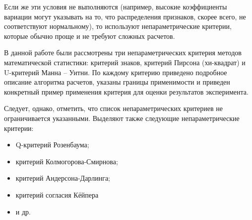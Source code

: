 \documentclass[12pt]{article}
\begin{document}
Если же эти условия не выполняются (например, высокие коэффициенты вариации могут указывать на то, что распределения признаков, скорее всего, не соответствуют нормальному), то используют непараметрические критерии, которые обычно проще и не требуют сложных расчетов.

В данной работе были рассмотрены три непараметрических критерия методов математической статистики: критерий знаков, критерий Пирсона (хи-квадрат) и U-критерий Манна – Уитни. По каждому критерию приведено подробное описание алгоритма расчетов, указаны границы применимости и приведен конкретный пример применения критерия для оценки результатов эксперимента.

Следует, однако, отметить, что список непараметрических критериев не ограничивается указанными. Выделяют также следующие непараметрические критерии:

\begin{itemize}
    \item Q-критерий Розенбаума;
    \item критерий Колмогорова-Смирнова;
    \item критерий Андерсона-Дарлинга;
    \item критерий согласия Кёйпера
    \item и др.
\end{itemize}
\end{document}
